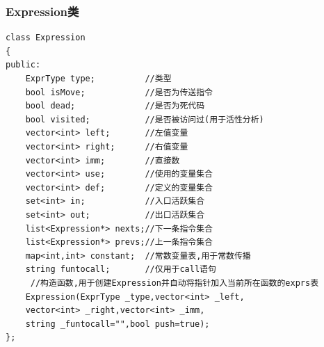 \documentclass[UTF8]{article}
\begin{document}
\subsubsection{Expression类}
\begin{lstlisting}
class Expression
{
public:
    ExprType type;          //类型
    bool isMove;            //是否为传送指令
    bool dead;              //是否为死代码
    bool visited;           //是否被访问过(用于活性分析)
    vector<int> left;       //左值变量
    vector<int> right;      //右值变量
    vector<int> imm;        //直接数
    vector<int> use;        //使用的变量集合
    vector<int> def;        //定义的变量集合
    set<int> in;            //入口活跃集合
    set<int> out;           //出口活跃集合
    list<Expression*> nexts;//下一条指令集合
    list<Expression*> prevs;//上一条指令集合
    map<int,int> constant;  //常数变量表,用于常数传播
    string funtocall;       //仅用于call语句
     //构造函数,用于创建Expression并自动将指针加入当前所在函数的exprs表
    Expression(ExprType _type,vector<int> _left,
    vector<int> _right,vector<int> _imm,
    string _funtocall="",bool push=true);
};
\end{lstlisting}
\end{document}
